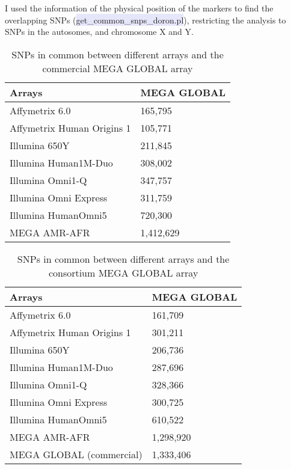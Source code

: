 \documentclass[11pt]{report}
\begin{document}
I used the information of the physical position of the markers to find the overlapping SNPs (\colorbox{Lavender}{get\_common\_snps\_doron.pl}), restricting the analysis to SNPs in the autosomes, and chromosome X and Y. 
\\

\begin{table}[ht]
\centering
\caption{SNPs in common between different arrays and the commercial MEGA GLOBAL array}
\label{my-label}
\begin{tabular}{|l||l|}
\hline
Arrays & MEGA GLOBAL \\ \hline \hline
Affymetrix 6.0 & 165,795 \\ \hline
Affymetrix Human Origins 1 & 105,771 \\ \hline
Illumina 650Y & 211,845 \\ \hline
Illumina Human1M-Duo & 308,002 \\ \hline
Illumina Omni1-Q & 347,757\\ \hline
Illumina Omni Express & 311,759 \\ \hline
Illumina HumanOmni5 & 720,300\\ \hline
MEGA AMR-AFR & 1,412,629 \\ \hline
\end{tabular}
\end{table}

\newpage
\begin{table}[ht]
\centering
\caption{SNPs in common between different arrays and the consortium MEGA GLOBAL array}
\label{my-label}
\begin{tabular}{|l||l|}
\hline
Arrays & MEGA GLOBAL \\ \hline \hline
Affymetrix 6.0 & 161,709 \\ \hline
Affymetrix Human Origins 1 & 301,211 \\ \hline
Illumina 650Y & 206,736 \\ \hline
Illumina Human1M-Duo & 287,696 \\ \hline
Illumina Omni1-Q & 328,366\\ \hline
Illumina Omni Express & 300,725 \\ \hline
Illumina HumanOmni5 & 610,522\\ \hline
MEGA AMR-AFR & 1,298,920 \\ \hline
MEGA GLOBAL (commercial) & 1,333,406 \\ \hline
\end{tabular}
\end{table}
\end{document}
